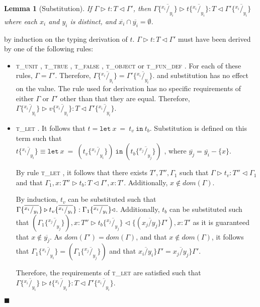 \documentclass[preprint]{sigplanconf}
\newtheorem{lem}{Lemma}
\newcommand{\tunit}{\textsc{t\_unit} }
\newcommand{\ttrue}{\textsc{t\_true} }
\newcommand{\tfalse}{\textsc{t\_false} }
\newcommand{\tobj}{\textsc{t\_object} }
\newcommand{\tfundef}{\textsc{t\_fun\_def} }
\newcommand{\tlet}{\textsc{t\_let} }
\newcommand{\typerule}[4]{#1 \triangleright #2 : #3 \triangleleft #4}
\newcommand{\subst}[3]{#3 \{\overline{^{#1}/_{#2}}\}}
\newcommand{\lett}[3]{\mathtt{let}\:#1\:\mathtt{=}\:#2\:\mathtt{in}\:#3}
\newcommand{\qed}{$\blacksquare$}
\newenvironment{proof}{\vspace{1ex}\noindent{\bf Proof}\hspace{0.5em}}
  {\hfill\qed\vspace{1ex}}
\begin{document}
\begin{lem}[Substitution]
\label{lem:subst}
If $\typerule{\Gamma}{t}{T}{\Gamma'}$, then
$\typerule
{\subst{x_i}{y_i}{\Gamma}}
{\subst{x_i}{y_i}{t}}
{T}
{\subst{x_i}{y_i}{\Gamma'}}$
where each $x_i$ and $y_i$ is distinct, and $\overline{x_i} \cap \overline{y_i} = \emptyset$.
\end{lem}
\begin{proof}
by induction on the typing derivation of $t$. $\typerule{\Gamma}{t}{T}{\Gamma'}$
must have been derived by one of the following rules:

\begin{itemize}

\item \tunit, \ttrue, \tfalse, \tobj or \tfundef. For each of these rules,
$\Gamma = \Gamma'$. Therefore, $\subst{x_i}{y_i}{\Gamma} = \subst{x_i}{y_i}{\Gamma'}$.
and substitution has no effect on the value. The rule used for derivation
has no specific requirements of either $\Gamma$ or $\Gamma'$ other than that 
they are equal.
Therefore, $\typerule{\subst{x_i}{y_i}{\Gamma}}{\subst{x_i}{y_i}{v}}{T}{\subst{x_i}{y_i}{\Gamma'}}$.

\item \tlet. It follows that $t = \lett{x}{t_v}{t_b}$. 
Substitution is defined on this term such that \\
$\subst{x_i}{y_i}{t} \equiv 
\lett{x}{( \subst{x_i}{y_i}{t_v} )}{(\subst{x_j}{y_j}{t_b})}$
, where $\overline{y_j} = \overline{y_i} - \{ x \}$.

By rule \tlet, it follows
that there exists $T', T'', \Gamma_1$ such that
$\typerule{\Gamma}{t_v}{T''}{\Gamma_1}$ and that
$\typerule{\Gamma_1, x : T''}{t_b}{T}{\Gamma', x : T'}$.
Additionally, $x \notin dom(\Gamma)$.

By induction, $t_v$ can be substituted such that 
$\typerule
{\subst{x_i}{y_i}{\Gamma}}
{\subst{x_i}{y_i}{t_v}}
{\subst{x_i}{y_i}{\Gamma_1}}
$.
Additionally, $t_b$ can be substituted such that
$(\subst{x_j}{y_j}{\Gamma_1}) , x : T'' \triangleright \subst{x_j}{y_j}{t_b} \triangleleft \{ (\overline{x_j / y_j} \} \Gamma') , x : T'$ as it is guaranteed that $x \notin \overline{y_j}$.
As $dom(\Gamma') = dom(\Gamma)$, and that $x \notin dom(\Gamma)$, it follows that $\subst{x_i}{y_i}{\Gamma_1} = (\subst{x_j}{y_j}{\Gamma_1})$ and
that $\overline{x_i / y_i} \} \Gamma' = \overline{x_j / y_j} \} \Gamma'$.

Therefore, the requirements of \tlet are satisfied such that
$\typerule{\subst{x_i}{y_i}{\Gamma}}{\subst{x_i}{y_i}{t}}{T}{\subst{x_i}{y_i}{\Gamma'}}$.


\end{itemize}
\end{proof}
\end{document}
